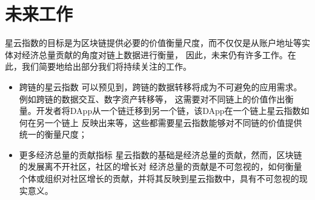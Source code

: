\section{未来工作}
星云指数的目标是为区块链提供必要的价值衡量尺度，而不仅仅是从账户地址等实体对经济总量贡献的角度对链上数据进行衡量，
因此，未来仍有许多工作。在此，我们简要地给出部分我们将持续关注的工作。
\begin{itemize}
\item{跨链的星云指数} 可以预见到，跨链的数据转移将成为不可避免的应用需求。例如跨链的数据交互、数字资产转移等，
这需要对不同链上的价值作出衡量。开发者将DApp从一个链迁移到另一个链，该DApp在一个链上星云指数如何在另一个链上
反映出来等，这些都需要星云指数能够对不同链的价值提供统一的衡量尺度；
\item{更多经济总量的贡献指标} 星云指数的基础是经济总量的贡献，然而，区块链的发展离不开社区，社区的增长对
经济总量的贡献是不可忽视的，如何衡量个体或组织对社区增长的贡献，并将其反映到星云指数中，具有不可忽视的现实意义。

\end{itemize}
